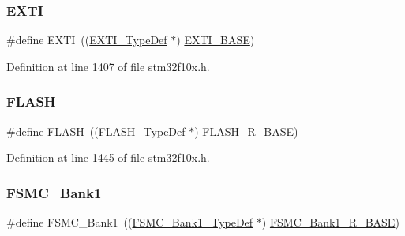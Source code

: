 \mbox{\label{group___peripheral__declaration_ga9189e770cd9b63dadd36683eb9843cac}} 
\subsubsection{\texorpdfstring{E\+X\+TI}{EXTI}}
{\footnotesize\ttfamily \#define E\+X\+TI~((\hyperlink{struct_e_x_t_i___type_def}{E\+X\+T\+I\+\_\+\+Type\+Def} $\ast$) \hyperlink{group___peripheral__memory__map_ga87371508b3bcdcd98cd1ec629be29061}{E\+X\+T\+I\+\_\+\+B\+A\+SE})}



Definition at line 1407 of file stm32f10x.\+h.

\mbox{\label{group___peripheral__declaration_ga844ea28ba1e0a5a0e497f16b61ea306b}} 
\subsubsection{\texorpdfstring{F\+L\+A\+SH}{FLASH}}
{\footnotesize\ttfamily \#define F\+L\+A\+SH~((\hyperlink{struct_f_l_a_s_h___type_def}{F\+L\+A\+S\+H\+\_\+\+Type\+Def} $\ast$) \hyperlink{group___peripheral__memory__map_ga8e21f4845015730c5731763169ec0e9b}{F\+L\+A\+S\+H\+\_\+\+R\+\_\+\+B\+A\+SE})}



Definition at line 1445 of file stm32f10x.\+h.

\mbox{\label{group___peripheral__declaration_ga2a759bad07fe730c99f9e1490e646220}} 
\subsubsection{\texorpdfstring{F\+S\+M\+C\+\_\+\+Bank1}{FSMC\_Bank1}}
{\footnotesize\ttfamily \#define F\+S\+M\+C\+\_\+\+Bank1~((\hyperlink{struct_f_s_m_c___bank1___type_def}{F\+S\+M\+C\+\_\+\+Bank1\+\_\+\+Type\+Def} $\ast$) \hyperlink{group___peripheral__memory__map_gad196fe6f5e4041b201d14f43508c06d2}{F\+S\+M\+C\+\_\+\+Bank1\+\_\+\+R\+\_\+\+B\+A\+SE})}



